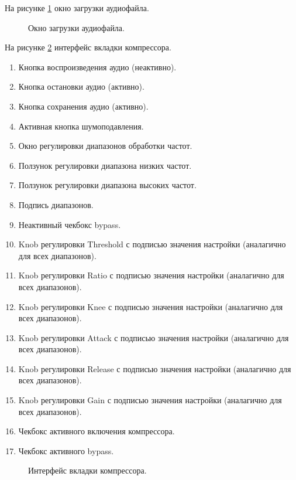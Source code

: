 На рисунке \ref{WindLoad:image} окно загрузки аудиофайла.

\begin{figure}[ht]
	\caption{Окно загрузки аудиофайла.}
	\label{WindLoad:image}
\end{figure}

На рисунке \ref{CompWind:image} интерфейс вкладки компрессора.

\begin{enumerate}
	\item Кнопка воспроизведения аудио (неактивно).
	\item Кнопка остановки аудио (активно).
	\item Кнопка сохранения аудио (активно).
	\item Активная кнопка шумоподавления.
	\item Окно регулировки диапазонов обработки частот.
	\item Ползунок регулировки диапазона низких частот.
	\item Ползунок регулировки диапазона высоких частот.
	\item Подпись диапазонов.
	\item Неактивный чекбокс bypass.
	\item Knob регулировки Threshold с подписью значения настройки (аналагично для всех диапазонов).
	\item Knob регулировки Ratio с подписью значения настройки (аналагично для всех диапазонов).
	\item Knob регулировки Knee с подписью значения настройки (аналагично для всех диапазонов).
	\item Knob регулировки Attack с подписью значения настройки (аналагично для всех диапазонов).
	\item Knob регулировки Release с подписью значения настройки (аналагично для всех диапазонов).	
	\item Knob регулировки Gain с подписью значения настройки (аналагично для всех диапазонов).
	\item Чекбокс активного включения компрессора.
	\item Чекбокс активного bypass.
\end{enumerate}

\begin{figure}[ht]
	\caption{Интерфейс вкладки компрессора.}
	\label{CompWind:image}
\end{figure}

